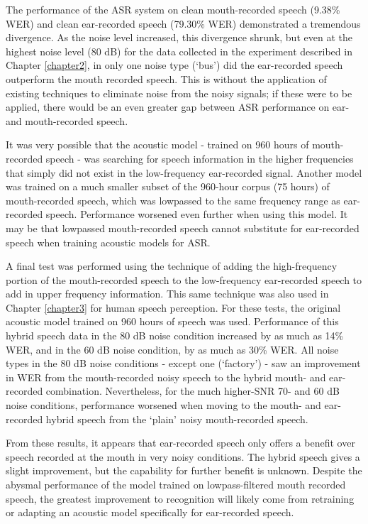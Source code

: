 The performance of the ASR system on clean mouth-recorded speech (9.38\% WER) and clean ear-recorded speech (79.30\% WER) demonstrated a tremendous divergence.  As the noise level increased, this divergence shrunk, but even at the highest noise level (80 dB) for the data collected in the experiment described in Chapter \ref{chapter2}, in only one noise type (`bus') did the ear-recorded speech outperform the mouth recorded speech.  This is without the application of existing techniques to eliminate noise from the noisy signals; if these were to be applied, there would be an even greater gap between ASR performance on ear- and mouth-recorded speech.

It was very possible that the acoustic model - trained on 960 hours of mouth-recorded speech - was searching for speech information in the higher frequencies that simply did not exist in the low-frequency ear-recorded signal.  Another model was trained on a much smaller subset of the 960-hour corpus (75 hours) of mouth-recorded speech, which was lowpassed to the same frequency range as ear-recorded speech.  Performance worsened even further when using this model.  It may be that lowpassed mouth-recorded speech cannot substitute for ear-recorded speech when training acoustic models for ASR.

A final test was performed using the technique of adding the high-frequency portion of the mouth-recorded speech to the low-frequency ear-recorded speech to add in upper frequency information.  This same technique was also used in Chapter \ref{chapter3} for human speech perception.  For these tests, the original acoustic model trained on 960 hours of speech was used. Performance of this hybrid speech data in the 80 dB noise condition increased by as much as 14\% WER, and in the 60 dB noise condition, by as much as 30\% WER.  All noise types in the 80 dB noise conditions - except one (`factory') - saw an improvement in WER from the mouth-recorded noisy speech to the hybrid mouth- and ear-recorded combination.  Nevertheless, for the much higher-SNR 70- and 60 dB noise conditions, performance worsened when moving to the mouth- and ear-recorded hybrid speech from the `plain' noisy mouth-recorded speech.  

From these results, it appears that ear-recorded speech only offers a benefit over speech recorded at the mouth in very noisy conditions.  The hybrid speech gives a slight improvement, but the capability for further benefit is unknown.  Despite the abysmal performance of the model trained on lowpass-filtered mouth recorded speech, the greatest improvement to recognition will likely come from retraining or adapting an acoustic model specifically for ear-recorded speech.


